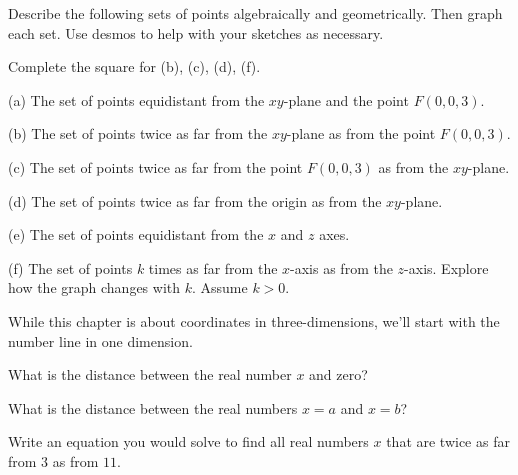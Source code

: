 \documentclass{ximera}
\begin{document}
\begin{question} \label{Q2:Coordinates}
Describe the following sets of points algebraically and geometrically. Then graph each set. Use desmos to help with your sketches as necessary.

Complete the square for (b), (c), (d), (f).

(a) The set of points equidistant from the $xy$-plane and the point $F(0,0,3)$.

(b) The set of points twice as far from the $xy$-plane as from the point $F(0,0,3)$.

(c) The set of points twice as far from the point $F(0,0,3)$ as from the $xy$-plane.


(d) The set of points twice as far from the origin as from the $xy$-plane.

(e) The set of points equidistant from the $x$ and $z$ axes.

(f) The set of points $k$ times as far from the $x$-axis as from the $z$-axis. Explore how the graph changes with $k$. Assume $k>0$.

\end{question}



While this chapter is about coordinates in three-dimensions, we'll start with the number line in one dimension.

\begin{question}  \label{Q0:Coordinates}
What is the distance between the real number $x$ and zero?
\begin{selectAll}
\end{selectAll}
\end{question}

\begin{question}  \label{Q00:Coordinates}
What is the distance between the real numbers $x=a$ and $x=b$?
\begin{selectAll}
\end{selectAll}
\end{question}

\begin{question}  \label{Q50:Coordinates}
Write an equation you would solve to find all real numbers $x$ that are twice as far from $3$ as from $11$.
\begin{selectAll}
\end{selectAll}
\end{question}
\end{document}
